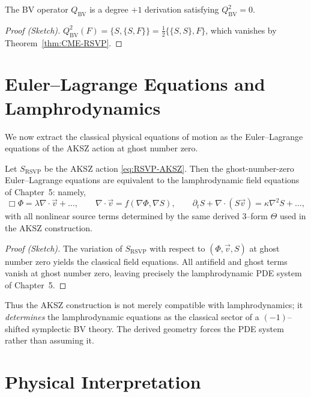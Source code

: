 \begin{proposition}
\label{prop:BV-square-zero}
The BV operator $Q_{\mathrm{BV}}$ is a degree $+1$ derivation satisfying
$Q_{\mathrm{BV}}^2=0$.
\end{proposition}

\begin{proof}[Proof (Sketch)]
$Q_{\mathrm{BV}}^2(F)=\{S,\{S,F\}\} = \frac12\{\{S,S\},F\}$, which
vanishes by Theorem~\ref{thm:CME-RSVP}.
\end{proof}


\section{Euler–Lagrange Equations and Lamphrodynamics}

We now extract the classical physical equations of motion as the
Euler–Lagrange equations of the AKSZ action at ghost number zero.

\begin{theorem}
Let $S_{\mathrm{RSVP}}$ be the AKSZ action
\eqref{eq:RSVP-AKSZ}. Then the ghost-number-zero Euler--Lagrange
equations are equivalent to the lamphrodynamic field equations of
Chapter~5: namely,
\[
\Box \Phi = \lambda\nabla\!\cdot\vec{v} + \dots,
\qquad
\nabla\cdot \vec v = f(\nabla\Phi,\nabla S),
\qquad
\partial_t S + \nabla\!\cdot(S\vec v) = \kappa\nabla^2 S + \dots,
\]
with all nonlinear source terms determined by the same derived $3$–form
$\Theta$ used in the AKSZ construction.
\end{theorem}

\begin{proof}[Proof (Sketch)]
The variation of $S_{\mathrm{RSVP}}$ with respect to
$(\Phi,\vec v,S)$ at ghost number zero yields the classical field
equations. All antifield and ghost terms vanish at ghost number zero,
leaving precisely the lamphrodynamic PDE system of Chapter~5.
\end{proof}

\begin{remark}
Thus the AKSZ construction is not merely compatible with
lamphrodynamics; it {\em determines} the lamphrodynamic equations as the
classical sector of a $(-1)$–shifted symplectic BV theory. The derived
geometry forces the PDE system rather than assuming it.
\end{remark}


\section{Physical Interpretation}


